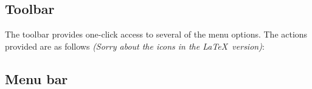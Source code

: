 \documentclass[twoside,11pt]{article}
\newcommand{\latexhtml}[2]{#1}
\renewcommand{\_}{\texttt{\symbol{95}}}
\begin{document}
\subsection{Toolbar}

The toolbar provides one-click access to several of the menu options.
The actions provided are as follows\latexhtml{
   {\it (Sorry about the icons in the \LaTeX\ version)}}{}:
\begin{description}
\item[\iconExit] \actionExit
\item[\iconSplitBeside] \actionBeside
\item[\iconSplitBelow] \actionBelow
\item[\iconSplitNone] \actionNone
\item[\iconClose] \actionCollapse
\item[\iconOpen] \actionExpand
\item[\iconExcise] \actionRCollapse
\item[\iconCascade] \actionRExpand
\item[\iconHelp] \actionHelp
\end{description}

\subsection{Menu bar}
\end{document}
